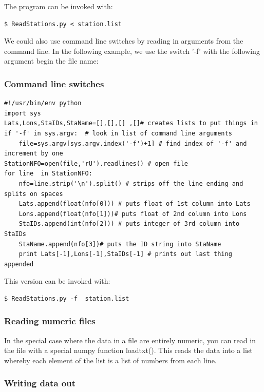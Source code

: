 \documentclass[11pt]{book}
\begin{document}
{{\noindent The program can be invoked with:

{\color{blue}\begin{verbatim}
$ ReadStations.py < station.list
\end{verbatim}}

We could also use command line switches by reading in arguments from the command line.  In the following example, we use the switch '-f' with the following argument begin the file name:

\subsubsection{Command line switches}

{ \color{blue} \begin{verbatim}
#!/usr/bin/env python
import sys
Lats,Lons,StaIDs,StaName=[],[],[] ,[]# creates lists to put things in
if '-f' in sys.argv:  # look in list of command line arguments
    file=sys.argv[sys.argv.index('-f')+1] # find index of '-f' and increment by one
StationNFO=open(file,'rU').readlines() # open file
for line  in StationNFO:
    nfo=line.strip('\n').split() # strips off the line ending and splits on spaces
    Lats.append(float(nfo[0])) # puts float of 1st column into Lats
    Lons.append(float(nfo[1]))# puts float of 2nd column into Lons
    StaIDs.append(int(nfo[2])) # puts integer of 3rd column into StaIDs
    StaName.append(nfo[3])# puts the ID string into StaName
    print Lats[-1],Lons[-1],StaIDs[-1] # prints out last thing appended
\end{verbatim}}

\noindent This version can be invoked with:

{\color{blue}\begin{verbatim}
$ ReadStations.py -f  station.list
\end{verbatim}}

\subsubsection{Reading numeric files}

In the special case where the data in a file are entirely numeric, you can read in the file with a special {\color{blue}numpy} function {\color{blue}loadtxt()}.  This reads the data into a list whereby each element of the list is a list of numbers from each line.

 \subsubsection{Writing data out}

}}
\end{document}
